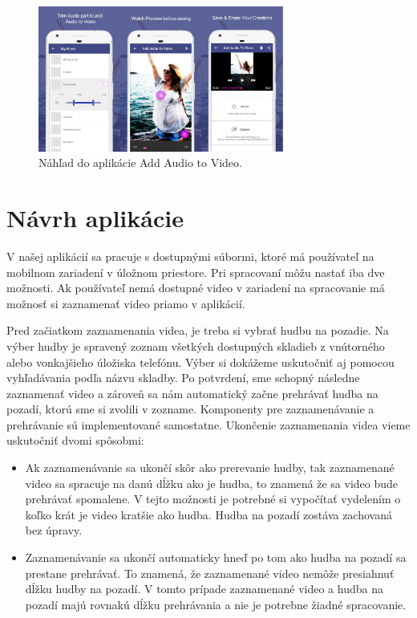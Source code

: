 \documentclass[12pt, oneside]{book}
\begin{document}
\begin{figure}[h]
    \centering
    \includegraphics[width=0.72\textwidth]{images/aplikacia3.jpg}
    \caption{Náhľad do aplikácie Add Audio to Video.}
    \label{fig:obr04}
\end{figure}

\section{Návrh aplikácie}

\hspace{15pt} V našej aplikácií sa pracuje s dostupnými súbormi, ktoré má používateľ na mobilnom zariadení v úložnom priestore. Pri spracovaní môžu nastať iba dve možnosti. Ak používateľ nemá dostupné video v zariadení na spracovanie má možnosť si zaznamenať video priamo v aplikácií.

\hspace{15pt} Pred začiatkom zaznamenania videa, je treba si vybrať hudbu na pozadie. Na výber hudby je spravený zoznam všetkých dostupných skladieb z vnútorného alebo vonkajšieho úložiska telefónu. Výber si dokážeme uskutočniť aj pomocou vyhľadávania podľa názvu skladby. Po potvrdení, sme schopný následne zaznamenať video a zároveň sa nám automatický začne prehrávať hudba na pozadí, ktorú sme si zvolili v zozname. Komponenty pre zaznamenávanie a prehrávanie sú implementované samostatne. Ukončenie zaznamenania videa vieme uskutočniť dvomi spôsobmi: 
\begin{itemize}
    \item Ak zaznamenávanie sa ukončí skôr ako prerevanie hudby, tak zaznamenané video sa spracuje na danú dĺžku ako je hudba, to znamená že sa video bude prehrávať spomalene. V tejto možnosti je potrebné si vypočítať vydelením o koľko krát je video kratšie ako hudba. Hudba na pozadí zostáva zachovaná bez úpravy.
    \item Zaznamenávanie sa ukončí automaticky hneď po tom ako hudba na pozadí sa prestane prehrávať. To znamená, že zaznamenané video nemôže presiahnuť dĺžku hudby na pozadí. V tomto prípade zaznamenané video a hudba na pozadí majú rovnakú dĺžku prehrávania a nie je potrebne žiadné spracovanie.  
\end{itemize}
\end{document}
